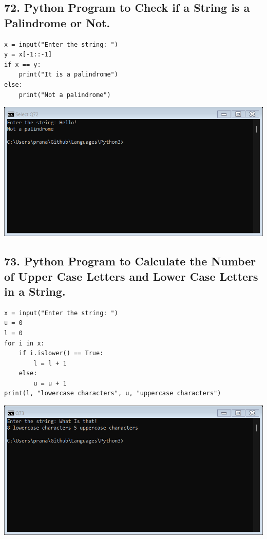 \documentclass[12pt]{article}
\begin{document}
\subsection*{72. Python Program to Check if a String is a Palindrome or Not.}
\begin{verbatim}
x = input("Enter the string: ")
y = x[-1::-1]
if x == y:
    print("It is a palindrome")
else:
    print("Not a palindrome")
\end{verbatim}
\includegraphics[width=\linewidth]{images/72.png}

\subsection*{73. Python Program to Calculate the Number of Upper Case Letters and Lower Case Letters in a String.}
\begin{verbatim}
x = input("Enter the string: ")
u = 0
l = 0
for i in x:
    if i.islower() == True:
        l = l + 1
    else:
        u = u + 1
print(l, "lowercase characters", u, "uppercase characters")
\end{verbatim}
\includegraphics[width=\linewidth]{images/73.png}
\end{document}
